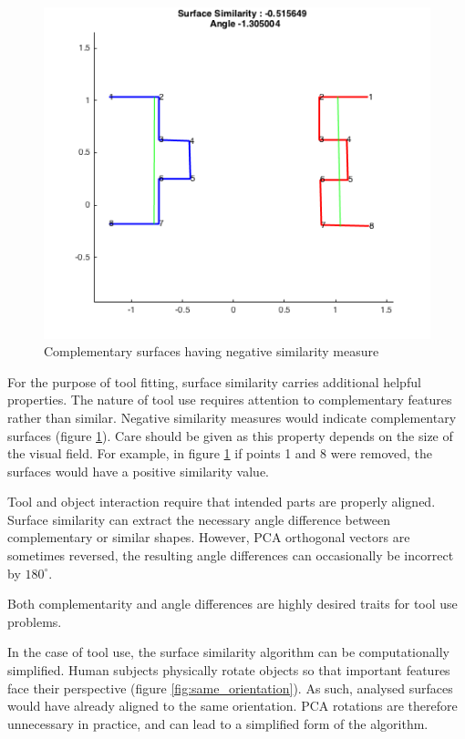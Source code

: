 \documentclass[11]{article}
\begin{document}
\begin{figure}[!h]
  \centering
  \includegraphics[width=.6\textwidth]{figures/complementary.png}
  \caption{Complementary surfaces having negative similarity measure}
  \label{fig:complementary}
\end{figure}  

For the purpose of tool fitting, surface similarity carries additional helpful properties. 
The nature of tool use requires attention to complementary features rather than similar. 
Negative similarity measures would indicate complementary surfaces (figure \ref{fig:complementary}). 
Care should be given as this property depends on the size of the visual field.
For example, in figure \ref{fig:complementary} if points 1 and 8 were removed, the surfaces would have 
a positive similarity value. 

Tool and object interaction require that intended parts are properly aligned.
Surface similarity can extract the necessary angle difference between complementary or similar shapes.
However, PCA orthogonal vectors are sometimes reversed, the resulting angle differences can occasionally be incorrect by $180^{\circ}$. 

Both complementarity and angle differences are highly desired traits for tool use problems.

In the case of tool use, the surface similarity algorithm can be computationally simplified.
Human subjects physically rotate objects so that important features face their perspective (figure \ref{fig:same_orientation}). 
As such, analysed surfaces would have already aligned to the same orientation.
PCA rotations are therefore unnecessary in practice, and can lead to a simplified form of the algorithm.
\end{document}

